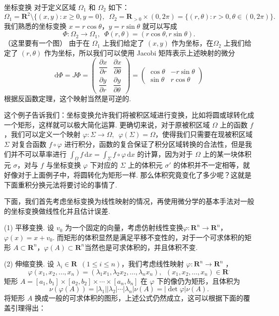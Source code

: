 \begin{example}{坐标变换}{}
    对于定义区域 $\Omega_1$ 和 $\Omega_2$ 如下：
    \[\Omega_1 = \mathbf{R}^2\setminus\{(x, y) \colon x\geqslant 0, y = 0\},\enspace \Omega_2 = \mathbf{R}_{>0}\times (0, 2\pi) = \{(r, \theta) \colon r>0, \theta\in(0, 2\pi)\}.\]
    我们熟悉的坐标变换 $x = r\cos\theta$，$y = r\sin\theta$ 就可以写成 \[\Phi: \Omega_2\to\Omega_1,\enspace \Phi(r, \theta) = (r\cos\theta, r\sin\theta).\]（这里要有一个图）
    由于在 $\Omega_1$ 上我们给定了 $(x, y)$ 作为坐标，在$\Omega_2$ 上我们给定了 $(r, \theta)$ 作为坐标，所以我们可以使用 Jacobi 矩阵表示上述映射的微分
    \[
        \mathrm{d}\Phi = J\Phi = \begin{pmatrix}
            \dfrac{\partial x}{\partial r} & \dfrac{\partial x}{\partial \theta} \\
            \dfrac{\partial y}{\partial r} & \dfrac{\partial y}{\partial \theta}
        \end{pmatrix} = \begin{pmatrix}
            \cos\theta & -r\sin\theta \\
            \sin\theta & r\cos\theta
        \end{pmatrix}
    \]
    根据反函数定理，这个映射当然是可逆的.
\end{example}

这个例子告诉我们：坐标变换允许我们将被积区域进行变换，比如将圆或球转化成一个矩形，这样就可以极大简化运算. 更确切来说，对于原被积区域 $\Omega$ 上的函数 $f$，我们可以定义一个映射 $\varphi: \Sigma \to \Omega,\enspace \varphi(\Sigma) = \Omega$，使得我们只需要在现被积区域 $\Sigma$ 对复合函数 $f\circ\varphi$ 进行积分，函数的复合保证了积分区域转换的合法性，但是我们并不可以草率进行 $\displaystyle\int_{\Omega}f\,\mathrm{d}x = \displaystyle\int_{\Sigma}f\circ \varphi\,\mathrm{d}x$ 的计算，因为对于 $\Omega$ 上的某一块体积元 $\sigma$，对与 $f$ 与坐标变换 $\varphi$ 下对应的 $\Sigma$ 上的体积元 $\sigma'$ 的体积并不一定相等，就好像对于上面例子中，将圆转化为矩形一样. 那么体积究竟变化了多少呢？这就是下面重积分换元法将要讨论的事情了.

下面，我们首先考虑坐标变换为线性映射的情况，再使用微分学的基本手法对一般的坐标变换做线性化并且估计误差.

(1) 平移变换. 设 $v_0$ 为一个固定的向量，考虑仿射线性变换$\varphi: \mathbf{R}^n\to \mathbf{R}^n$，$\varphi(x) = x + v_0$. 而矩形的体积显然是满足平移不变性的，对于一个可求体积的矩形 $A\subset \mathbf{R}^n$，$\varphi(A)\subset \mathbf{R}^n$当然也是可求体积的，并且体积不变.

(2) 伸缩变换. 设 $\lambda_i\in\mathbf{R}\enspace(1\leqslant i\leqslant n)$，我们考虑线性映射 $\varphi: \mathbf{R}^n\to \mathbf{R}^n$ ，
\[\varphi(x_1, x_2, \dots, x_n) = (\lambda_1x_1, \lambda_2x_2, \dots, \lambda_nx_n),\enspace (x_1, x_2, \dots, x_n)\in \mathbf{R}^.\]
矩形 $A = [a_1, b_1]\times [a_2, b_2]\times \cdots\times [a_n, b_n]$ 在 $\varphi$ 下的像仍为矩形，且体积为\[ \nu(\varphi(A)) = \vert\lambda_1\vert \vert\lambda_2\vert \cdots\vert\lambda_n\vert \nu(A) = \vert \det\varphi\vert \nu(A).\]
将矩形 $A$ 换成一般的可求体积的图形，上述公式仍然成立，这可以根据下面的覆盖引理得出：

